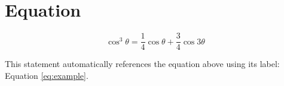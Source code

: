

\section{Equation}

\begin{equation}
    \cos^3 \theta =\frac{1}{4}\cos\theta+\frac{3}{4}\cos 3\theta
    \label{eq:example}
\end{equation}

This statement automatically references the equation above using its label: Equation \ref{eq:example}.